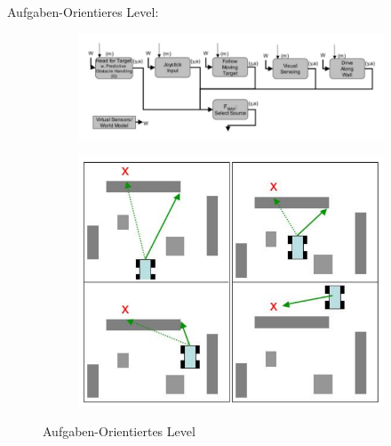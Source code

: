 Aufgaben-Orientieres Level:
\begin{figure}
	\begin{subfigure}{.5\textwidth}
		\centering
		\includegraphics[width=\textwidth]{figures/aufgaben_level.png}
	\end{subfigure}
	\begin{subfigure}{.5\textwidth}
		\centering
		\includegraphics[width=\textwidth]{figures/aufgaben_level_1.png}
	\end{subfigure}
	\caption{Aufgaben-Orientiertes Level}
	\label{ch:08:fig:aufgaben-orientiert}
\end{figure}
